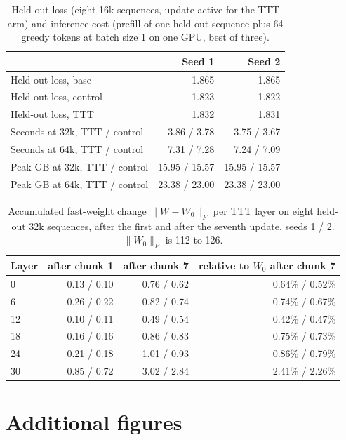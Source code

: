 \documentclass{article}
\begin{document}
\begin{table}[H]
\caption{Held-out loss (eight 16k sequences, update active for the TTT arm) and inference cost (prefill of one held-out sequence plus 64 greedy tokens at batch size 1 on one GPU, best of three).}
\centering
\footnotesize
\begin{tabular}{lrr}
\toprule
 & Seed 1 & Seed 2 \\
\midrule
Held-out loss, base & 1.865 & 1.865 \\
Held-out loss, control & 1.823 & 1.822 \\
Held-out loss, TTT & 1.832 & 1.831 \\
\midrule
Seconds at 32k, TTT / control & 3.86 / 3.78 & 3.75 / 3.67 \\
Seconds at 64k, TTT / control & 7.31 / 7.28 & 7.24 / 7.09 \\
Peak GB at 32k, TTT / control & 15.95 / 15.57 & 15.95 / 15.57 \\
Peak GB at 64k, TTT / control & 23.38 / 23.00 & 23.38 / 23.00 \\
\bottomrule
\end{tabular}
\end{table}

\begin{table}[H]
\caption{Accumulated fast-weight change $\|W - W_0\|_F$ per TTT layer on eight held-out 32k sequences, after the first and after the seventh update, seeds 1 / 2. $\|W_0\|_F$ is 112 to 126.}
\centering
\footnotesize
\begin{tabular}{lrrr}
\toprule
Layer & after chunk 1 & after chunk 7 & relative to $W_0$ after chunk 7 \\
\midrule
0 & 0.13 / 0.10 & 0.76 / 0.62 & 0.64\% / 0.52\% \\
6 & 0.26 / 0.22 & 0.82 / 0.74 & 0.74\% / 0.67\% \\
12 & 0.10 / 0.11 & 0.49 / 0.54 & 0.42\% / 0.47\% \\
18 & 0.16 / 0.16 & 0.86 / 0.83 & 0.75\% / 0.73\% \\
24 & 0.21 / 0.18 & 1.01 / 0.93 & 0.86\% / 0.79\% \\
30 & 0.85 / 0.72 & 3.02 / 2.84 & 2.41\% / 2.26\% \\
\bottomrule
\end{tabular}
\end{table}

\section{Additional figures}\label{app:figures}
\end{document}
